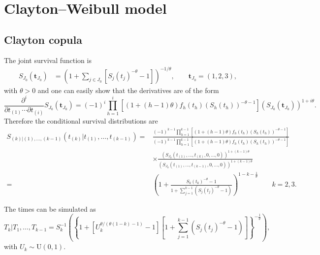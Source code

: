 \documentclass[a4paper,10pt]{article}
\begin{document}
\section*{Clayton--Weibull model}
\subsection*{Clayton copula}
The joint survival function is
  \begin{align}
    S_{J_0}(\textbf{t}_{J_0}) &= \left( 1+ \sum_{j\in J_0} \left[ S_j(t_j)^{-\theta} -1 \right] \right)^{-1/\theta},
      \qquad \textbf{t}_{J_0}=(1,2,3),
      \label{eq:joint123}
  \end{align}
  with $\theta>0$ and one can easily show that the derivatives are of the form
  \[
     \frac{\partial^i}{\partial t_{(1)} \cdots \partial t_{(i)}}
        S_{J_0}(\textbf{t}_{J_0}) = (-1)^i
        \prod_{h=1}^i \left[ (1+(h-1)\theta) f_h(t_h)\left(S_h(t_h)\right)^{-\theta-1} \right]
        \left(S_{J_0}(\textbf{t}_{J_0})\right)^{1+i\theta}.
  \]
  Therefore the conditional survival distributions are
  \begin{align}
    \nonumber
    S_{(k)|(1),\ldots,(k-1)} \left( t_{(k)}|t_{(1)},\ldots,t_{(k-1)} \right) 
    =& \frac{
        (-1)^{k-1} \prod_{h=1}^{k-1} \left[ (1+(h-1)\theta) f_h(t_h)\left(S_h(t_h)\right)^{-\theta-1} \right]
    }{
        (-1)^{k-1} \prod_{h=1}^{k-1} \left[ (1+(h-1)\theta) f_h(t_h)\left(S_h(t_h)\right)^{-\theta-1} \right]
    }
    \\ \nonumber
    &\times \frac{
        \left(S_{J_0}\left( t_{(1)},\ldots,t_{(k)},0,\ldots,0 \right)\right)^{1+(k-1)\theta}
    }{
        \left(S_{J_0}\left( t_{(1)},\ldots,t_{(k-1)}, 0,\ldots,0 \right)\right)^{1+(k-1)\theta}
    }
    \\
    =& \left(
      1+\frac{S_k(t_k)^{-\theta}-1}{1+\sum_{j=1}^{k-1} (S_j(t_j)^{-\theta}-1)}
    \right)^{1-k-\frac1\theta}
    \qquad  k= 2,3.
    \label{eq:condClay}
  \end{align}

  The times can be simulated as
  \begin{equation} \label{Tcond}
    T_k|T_1,\ldots,T_{k-1} = S_k^{-1}\left(
      \left\{ 1+
        \left[ U_k^{\theta/(\theta(1-k)-1)}-1\right]
        \left[ 1+ \sum_{j=1}^{k-1} \left( S_j(t_j)^{-\theta}-1 \right) \right]
      \right\}^{-\frac1\theta}
    \right),
  \end{equation}
  with $U_k\sim\text{U}(0,1)$.
\end{document}
